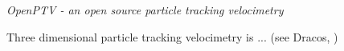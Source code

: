 \textit{OpenPTV - an open source particle tracking velocimetry} 

Three dimensional particle tracking velocimetry is ... (see Dracos, \cite{1996})